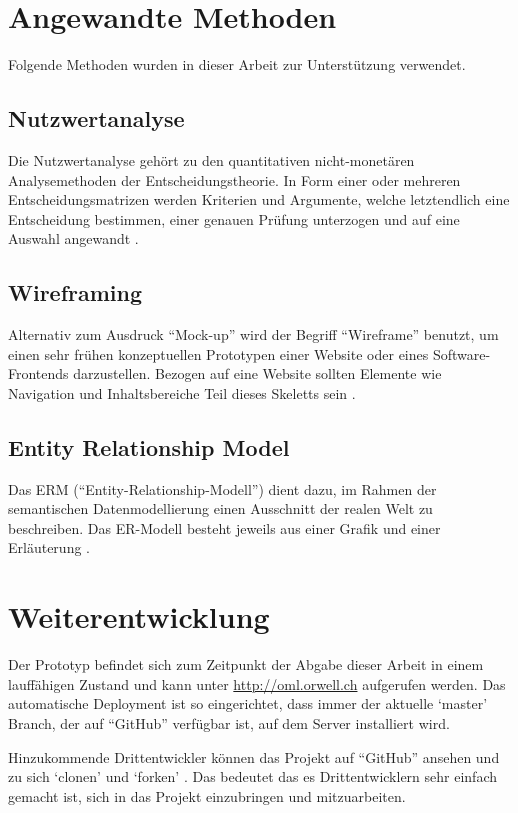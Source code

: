 \section{Angewandte Methoden}
Folgende Methoden wurden in dieser Arbeit zur Unterstützung verwendet. 

\subsection{Nutzwertanalyse}
Die Nutzwertanalyse gehört zu den quantitativen nicht-monetären Analysemethoden 
der Entscheidungstheorie. In Form einer oder mehreren 
Entscheidungsmatrizen werden Kriterien und Argumente, welche letztendlich eine 
Entscheidung bestimmen, einer genauen Prüfung unterzogen und auf eine Auswahl 
angewandt \cite{nutzwertanalyse}.

\subsection{Wireframing}
Alternativ zum Ausdruck ``Mock-up'' wird der Begriff ``Wireframe'' benutzt, um einen 
sehr frühen konzeptuellen Prototypen einer Website oder eines Software-Frontends 
darzustellen. Bezogen auf eine Website sollten Elemente wie Navigation und 
Inhaltsbereiche Teil dieses Skeletts sein \cite{wireframe}.

\subsection{Entity Relationship Model}
Das ERM (``Entity-Relationship-Modell'') dient dazu, im Rahmen der semantischen 
Datenmodellierung einen Ausschnitt der realen Welt zu beschreiben. 
Das ER-Modell besteht jeweils aus einer Grafik und einer Erläuterung \cite{erm}.

\section{Weiterentwicklung}
Der Prototyp befindet sich zum Zeitpunkt der Abgabe dieser Arbeit in einem
lauffähigen Zustand und kann unter \url{http://oml.orwell.ch} aufgerufen werden. 
Das automatische Deployment ist so eingerichtet, dass immer der aktuelle `master' 
Branch, der auf ``GitHub'' verfügbar ist, auf dem Server installiert wird.

Hinzukommende Drittentwickler können das Projekt auf ``GitHub'' ansehen und
zu sich `clonen' \cite{clone} und `forken' \cite{fork}. Das bedeutet das es
Drittentwicklern sehr einfach gemacht ist, sich in das Projekt einzubringen
und mitzuarbeiten.

